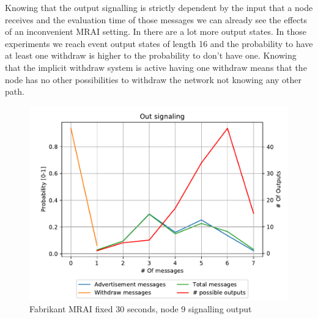 \documentclass[10pt,conference,letterpaper]{IEEEtran}
\newcommand{\figwidth}{0.78}
\newcommand{\figvspace}{-1.5em}
\begin{document}
Knowing that the output signalling is strictly dependent by the input that a 
node receives and the evaluation time of those messages we can already see the
effects of an inconvenient \ac{MRAI} setting.
In  there are a lot more output states.
In those experiments we reach event output states of length \num{16} and the 
probability to have at least one withdraw is higher to the probability to 
don't have one.
Knowing that the implicit withdraw system is active having one withdraw means
that the node has no other possibilities to withdraw the network not knowing any
other path.

\begin{figure}[tb]
	\centering
	\includegraphics[width=\figwidth\columnwidth]{images/fabrikant/fabrikant-30fixed/results_9_signaling_nmessage_prob}
	\caption{Fabrikant MRAI fixed 30 seconds, node 9 signalling output}
	\label{fig:fabr_30sec_9_signaling}
	\vspace{\figvspace}
\end{figure}
\end{document}
